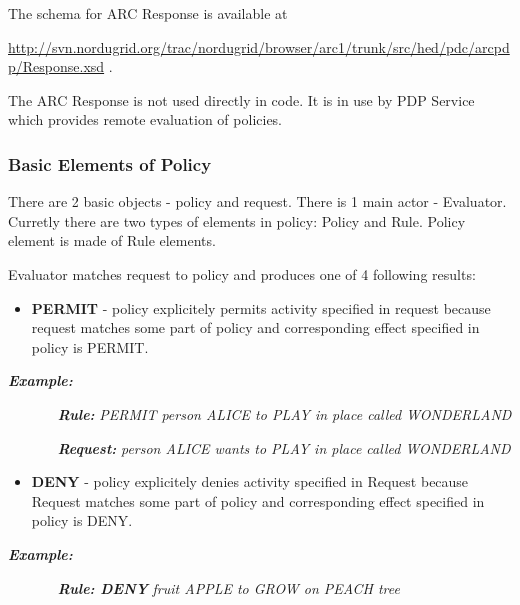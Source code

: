 \documentclass{article}
\newcommand\liststyleWWviiiNumxxi{%
\renewcommand\labelitemi{[F0B7?]}
\renewcommand\labelitemii{o}
\renewcommand\labelitemiii{[F0A7?]}
\renewcommand\labelitemiv{[F0B7?]}
}
\begin{document}
{\upshape\color{black}
The schema for ARC Response is available at}

{\upshape\color{black}
\url{http://svn.nordugrid.org/trac/nordugrid/browser/arc1/trunk/src/hed/pdc/arcpdp/Response.xsd}
.}

{\upshape\color{black}
The ARC Response is not used directly in code. It is in use by PDP
Service which provides remote evaluation of policies. }

\subsubsection{Basic Elements of Policy}
{\upshape\color{black}
There are 2 basic objects - {\textquotedbl}policy{\textquotedbl} and
{\textquotedbl}request{\textquotedbl}. There is 1 main actor -
Evaluator. Curretly there are two types of elements in policy: Policy
and Rule. Policy element is made of Rule elements.}

{\color{black}
Evaluator matches request to policy and produces one of 4 following
results:}

\liststyleWWviiiNumxxi
\begin{itemize}
\item {\color{black}
\textbf{PERMIT} - policy explicitely permits activity specified in
request because request matches some part of policy and corresponding
effect specified in policy is PERMIT. }
\end{itemize}
{\bfseries\itshape\color{black}
Example: }

{\upshape\color{black}
\textbf{\textit{\ \ \ \ \ \ }}\textbf{\textit{Rule: }}\textit{PERMIT
person ALICE to PLAY in place called WONDERLAND}}

{\upshape\color{black}
\textbf{\textit{\ \ \ \ \ \ }}\textbf{\textit{Request: }}\textit{person
ALICE wants to PLAY in place called WONDERLAND}}

\liststyleWWviiiNumxxi
\begin{itemize}
\item {\color{black}
\textbf{DENY} - policy explicitely denies activity specified in Request
because Request matches some part of policy and corresponding effect
specified in policy is DENY.}
\end{itemize}
{\bfseries\itshape\color{black}
Example:}

{\upshape\color{black}
\textbf{\textit{\ \ \ \ \ \ }}\textbf{\textit{Rule: DENY }}\textit{fruit
APPLE to GROW on PEACH tree}}
\end{document}
